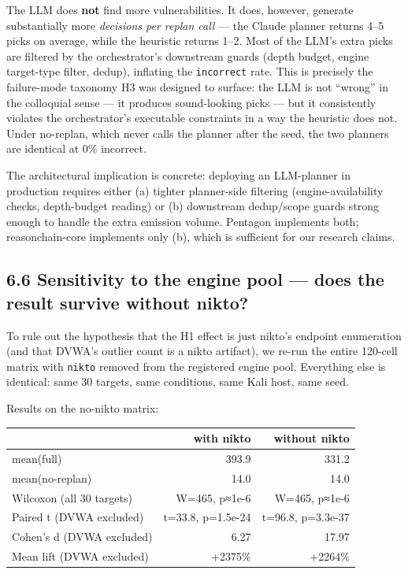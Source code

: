\documentclass[
]{article}
\newcounter{none} %
\begin{document}
The LLM does \textbf{not} find more vulnerabilities. It does, however,
generate substantially more \emph{decisions per replan call} --- the
Claude planner returns 4--5 picks on average, while the heuristic
returns 1--2. Most of the LLM's extra picks are filtered by the
orchestrator's downstream guards (depth budget, engine target-type
filter, dedup), inflating the \texttt{incorrect} rate. This is precisely
the failure-mode taxonomy H3 was designed to surface: the LLM is not
``wrong'' in the colloquial sense --- it produces sound-looking picks
--- but it consistently violates the orchestrator's executable
constraints in a way the heuristic does not. Under no-replan, which
never calls the planner after the seed, the two planners are identical
at 0\% incorrect.

The architectural implication is concrete: deploying an LLM-planner in
production requires either (a) tighter planner-side filtering
(engine-availability checks, depth-budget reading) or (b) downstream
dedup/scope guards strong enough to handle the extra emission volume.
Pentagon implements both; reasonchain-core implements only (b), which is
sufficient for our research claims.

\subsection{6.6 Sensitivity to the engine pool --- does the result
survive without
nikto?}\label{sensitivity-to-the-engine-pool-does-the-result-survive-without-nikto}

To rule out the hypothesis that the H1 effect is just nikto's endpoint
enumeration (and that DVWA's outlier count is a nikto artifact), we
re-run the entire 120-cell matrix with \texttt{nikto} removed from the
registered engine pool. Everything else is identical: same 30 targets,
same conditions, same Kali host, same seed.

Results on the no-nikto matrix:

{\def\LTcaptype{none} %
\begin{longtable}[]{@{}lrr@{}}
\toprule\noalign{}
& with nikto & without nikto \\
\midrule\noalign{}
\endhead
\bottomrule\noalign{}
\endlastfoot
mean(full) & 393.9 & 331.2 \\
mean(no-replan) & 14.0 & 14.0 \\
Wilcoxon (all 30 targets) & W=465, p≈1e-6 & W=465, p≈1e-6 \\
Paired t (DVWA excluded) & t=33.8, p=1.5e-24 & t=96.8, p=3.3e-37 \\
Cohen's d (DVWA excluded) & 6.27 & 17.97 \\
Mean lift (DVWA excluded) & +2375\% & +2264\% \\
\end{longtable}
}
\end{document}
